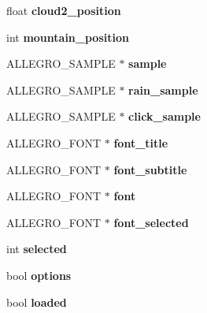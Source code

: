 \begin{DoxyCompactItemize}
\item 
\hypertarget{structMenu_a143c3675204c7cf1381decbfe4be5476}{float {\bfseries cloud2\-\_\-position}}\label{structMenu_a143c3675204c7cf1381decbfe4be5476}

\item 
\hypertarget{structMenu_a10770a9453a92c77d64c7fdb0e34e725}{int {\bfseries mountain\-\_\-position}}\label{structMenu_a10770a9453a92c77d64c7fdb0e34e725}

\item 
\hypertarget{structMenu_a19a25811d2d08b8fa1d1819088168b72}{\-A\-L\-L\-E\-G\-R\-O\-\_\-\-S\-A\-M\-P\-L\-E $\ast$ {\bfseries sample}}\label{structMenu_a19a25811d2d08b8fa1d1819088168b72}

\item 
\hypertarget{structMenu_ad14705d9172d76dc241de8f4657254cc}{\-A\-L\-L\-E\-G\-R\-O\-\_\-\-S\-A\-M\-P\-L\-E $\ast$ {\bfseries rain\-\_\-sample}}\label{structMenu_ad14705d9172d76dc241de8f4657254cc}

\item 
\hypertarget{structMenu_a012f284df5f9d8e39785a264c736c506}{\-A\-L\-L\-E\-G\-R\-O\-\_\-\-S\-A\-M\-P\-L\-E $\ast$ {\bfseries click\-\_\-sample}}\label{structMenu_a012f284df5f9d8e39785a264c736c506}

\item 
\hypertarget{structMenu_aac0297cac51099ec75020a510a6dcbb3}{\-A\-L\-L\-E\-G\-R\-O\-\_\-\-F\-O\-N\-T $\ast$ {\bfseries font\-\_\-title}}\label{structMenu_aac0297cac51099ec75020a510a6dcbb3}

\item 
\hypertarget{structMenu_a18d7377e798bac336e55e253243d4e13}{\-A\-L\-L\-E\-G\-R\-O\-\_\-\-F\-O\-N\-T $\ast$ {\bfseries font\-\_\-subtitle}}\label{structMenu_a18d7377e798bac336e55e253243d4e13}

\item 
\hypertarget{structMenu_aa4e0229cb315ef9e0ea90263b26a37f8}{\-A\-L\-L\-E\-G\-R\-O\-\_\-\-F\-O\-N\-T $\ast$ {\bfseries font}}\label{structMenu_aa4e0229cb315ef9e0ea90263b26a37f8}

\item 
\hypertarget{structMenu_a577ad17dfddafaae41dde63ca7970003}{\-A\-L\-L\-E\-G\-R\-O\-\_\-\-F\-O\-N\-T $\ast$ {\bfseries font\-\_\-selected}}\label{structMenu_a577ad17dfddafaae41dde63ca7970003}

\item 
\hypertarget{structMenu_a608e2768a5458057048bf1c7ab9a81aa}{int {\bfseries selected}}\label{structMenu_a608e2768a5458057048bf1c7ab9a81aa}

\item 
\hypertarget{structMenu_a239080567caece4982b2edd716c57223}{bool {\bfseries options}}\label{structMenu_a239080567caece4982b2edd716c57223}

\item 
\hypertarget{structMenu_afd245b822f2805677609fc0f78ee59ac}{bool {\bfseries loaded}}\label{structMenu_afd245b822f2805677609fc0f78ee59ac}

\end{DoxyCompactItemize}


